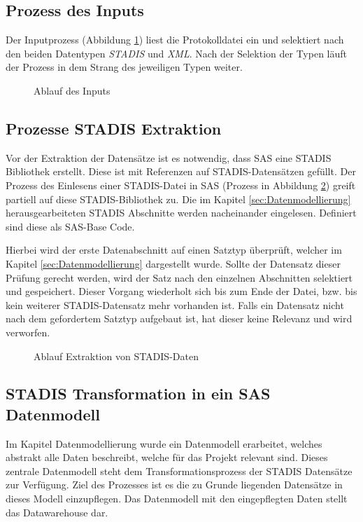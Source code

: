 	\subsection{Prozess des Inputs}
		Der Inputprozess (Abbildung \ref{fig:ProzessInput}) liest die Protokolldatei ein und selektiert nach den beiden Datentypen \textit{STADIS} und \textit{XML}.
		Nach der Selektion der Typen läuft der Prozess in dem Strang des jeweiligen Typen weiter.
		\begin{figure}[htbp]
			\caption{Ablauf des Inputs}
			\label{fig:ProzessInput}
		\end{figure}
	\subsection{Prozesse 
	 STADIS Extraktion}
		Vor der Extraktion der Datensätze ist es notwendig, dass SAS eine STADIS Bibliothek erstellt.
		Diese ist mit Referenzen auf STADIS-Datensätzen gefüllt.
		Der Prozess des Einlesens einer STADIS-Datei in SAS (Prozess in Abbildung \ref{fig:ProzessExtraktionStadis}) greift partiell auf diese STADIS-Bibliothek zu.
		Die im Kapitel \ref{sec:Datenmodellierung} herausgearbeiteten STADIS Abschnitte werden nacheinander eingelesen.
		Definiert sind diese als SAS-Base Code.
		
		Hierbei wird der erste Datenabschnitt auf einen Satztyp überprüft, welcher im Kapitel \ref{sec:Datenmodellierung} dargestellt wurde.
		Sollte der Datensatz dieser Prüfung gerecht werden, wird der Satz nach den einzelnen Abschnitten selektiert und gespeichert.
		Dieser Vorgang wiederholt sich bis zum Ende der Datei, bzw. bis kein weiterer STADIS-Datensatz mehr vorhanden ist.
		Falls ein Datensatz nicht nach dem gefordertem Satztyp aufgebaut ist, hat dieser keine Relevanz und wird verworfen.
				
		\begin{figure}[htbp]
				\caption{Ablauf Extraktion von STADIS-Daten}
				\label{fig:ProzessExtraktionStadis}
		\end{figure}
	\subsection{STADIS Transformation in ein SAS Datenmodell}
	
		Im Kapitel Datenmodellierung wurde ein Datenmodell erarbeitet, welches abstrakt alle Daten beschreibt, welche für das Projekt relevant sind.
		Dieses zentrale Datenmodell steht dem Transformationsprozess der STADIS Datensätze zur Verfügung.
		Ziel des Prozesses ist es die zu Grunde liegenden Datensätze in dieses Modell einzupflegen.
		Das Datenmodell mit den eingepflegten Daten stellt das Datawarehouse dar.
		

